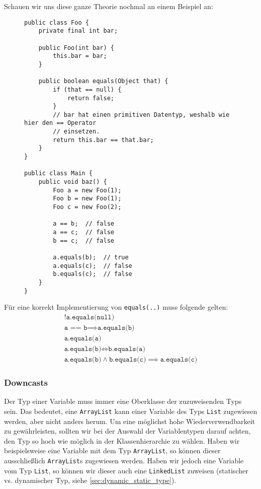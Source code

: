 		Schauen wir uns diese ganze Theorie nochmal an einem Beispiel an:
		\begin{figure}[H]
			\centering
			\begin{lstlisting}
public class Foo {
	private final int bar;

	public Foo(int bar) {
		this.bar = bar;
	}

	public boolean equals(Object that) {
		if (that == null) {
			return false;
		}
		// bar hat einen primitiven Datentyp, weshalb wie hier den == Operator
		// einsetzen.
		return this.bar == that.bar;
	}
}

public class Main {
	public void baz() {
		Foo a = new Foo(1);
		Foo b = new Foo(1);
		Foo c = new Foo(2);

		a == b;  // false
		a == c;  // false
		b == c;  // false

		a.equals(b);  // true
		a.equals(c);  // false
		b.equals(c);  // false
	}
}
\end{lstlisting}
		\end{figure}
		Für eine korrekt Implementierung von \lstinline|equals(..)| muss folgende gelten:
		\begin{align*}
			!\texttt{a.equals(null)} \\
			\texttt{a == b} \implies \texttt{a.equals(b)} \tag{Konsistenz} \\
			\texttt{a.equals(a)} \tag{Reflexivität} \\
			\texttt{a.equals(b)} \iff \texttt{b.equals(a)} \tag{Symmetrie} \\
			\texttt{a.equals(b)} \land \texttt{b.equals(c)} \implies \texttt{a.equals(c)} \tag{Transitivität}
		\end{align*}
	
	\subsubsection{Downcasts}
		Der Typ einer Variable muss immer eine Oberklasse der zuzuweisenden Typs sein. Das bedeutet, eine \lstinline|ArrayList| kann einer Variable des Typs \lstinline|List| zugewiesen werden, aber nicht anders herum. Um eine möglichst hohe Wiederverwendbarkeit zu gewährleisten, sollten wir bei der Auswahl der Variablentypen darauf achten, den Typ so hoch wie möglich in der Klassenhierarchie zu wählen. Haben wir beispielsweise eine Variable mit dem Typ \lstinline|ArrayList|, so können dieser ausschließlich \lstinline|ArrayList|s zugewiesen werden. Haben wir jedoch eine Variable vom Typ \lstinline|List|, so können wir dieser auch eine \lstinline|LinkedList| zuweisen (statischer vs. dynamischer Typ, siehe \ref{sec:dynamic_static_type}).
	

